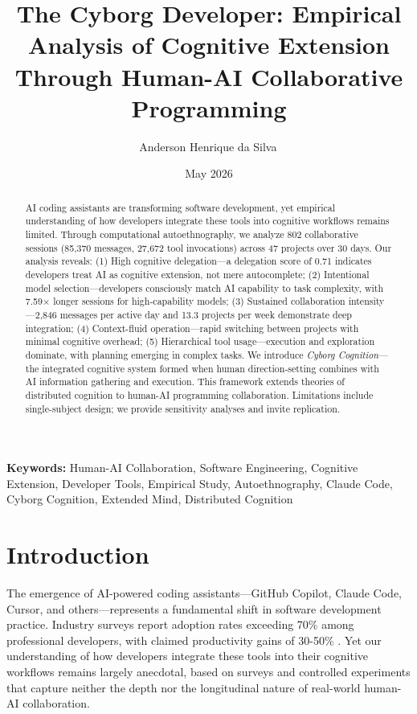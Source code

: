 \documentclass{ntlabs-preprint}
\title{The Cyborg Developer: Empirical Analysis of Cognitive Extension Through Human-AI Collaborative Programming}
\author[1,2]{Anderson Henrique da Silva\,\orcidlink{0009-0001-7144-4974}}
\affil[1]{\href{https://ntlabs.dev}{NTLabs.dev}}
\affil[2]{IFSULDEMINAS, Minas Gerais, Brasil}
\affil[ ]{\href{mailto:anderson@ntlabs.dev}{anderson@ntlabs.dev}}
\date{May 2026}
\begin{document}
\maketitle

\begin{abstract}
AI coding assistants are transforming software development, yet empirical understanding of how developers integrate these tools into cognitive workflows remains limited. Through computational autoethnography, we analyze 802 collaborative sessions (85,370 messages, 27,672 tool invocations) across 47 projects over 30 days. Our analysis reveals: (1) High cognitive delegation---a delegation score of 0.71 indicates developers treat AI as cognitive extension, not mere autocomplete; (2) Intentional model selection---developers consciously match AI capability to task complexity, with 7.59$\times$ longer sessions for high-capability models; (3) Sustained collaboration intensity---2,846 messages per active day and 13.3 projects per week demonstrate deep integration; (4) Context-fluid operation---rapid switching between projects with minimal cognitive overhead; (5) Hierarchical tool usage---execution and exploration dominate, with planning emerging in complex tasks. We introduce \textit{Cyborg Cognition}---the integrated cognitive system formed when human direction-setting combines with AI information gathering and execution. This framework extends theories of distributed cognition to human-AI programming collaboration. Limitations include single-subject design; we provide sensitivity analyses and invite replication.
\end{abstract}

\noindent\textbf{Keywords:} Human-AI Collaboration, Software Engineering, Cognitive Extension, Developer Tools, Empirical Study, Autoethnography, Claude Code, Cyborg Cognition, Extended Mind, Distributed Cognition

\section{Introduction}

The emergence of AI-powered coding assistants---GitHub Copilot, Claude Code, Cursor, and others---represents a fundamental shift in software development practice. Industry surveys report adoption rates exceeding 70\% among professional developers, with claimed productivity gains of 30-50\% \citep{github2023copilot}. Yet our understanding of how developers integrate these tools into their cognitive workflows remains largely anecdotal, based on surveys and controlled experiments that capture neither the depth nor the longitudinal nature of real-world human-AI collaboration.
\end{document}
